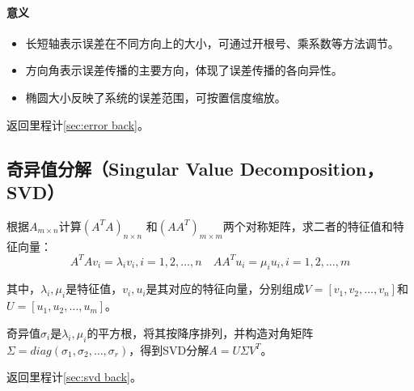 \documentclass[
12pt, %
a4paper, 
oneside, %
headinclude,footinclude, %
]{scrartcl}
\begin{document}
\paragraph{意义}
\begin{itemize}
\item 长短轴表示误差在不同方向上的大小，可通过开根号、乘系数等方法调节。
\item 方向角表示误差传播的主要方向，体现了误差传播的各向异性。
\item 椭圆大小反映了系统的误差范围，可按置信度缩放。
\end{itemize}

返回里程计\ref{sec:error back}。
\subsection[奇异值分解]{奇异值分解（Singular Value Decomposition，SVD）}\label{sec:svd}
根据$ A_{m \times n} $计算$ (A^T A)_{n \times n} $ 和$ (AA^T)_{m \times m} $两个对称矩阵，求二者的特征值和特征向量：
$$ A^T A v_i = \lambda_i v_i, i = 1, 2, \dots, n \quad AA^T u_i = \mu_i u_i, i = 1, 2, \dots, m $$

其中，$ \lambda_i, \mu_i $是特征值，$ v_i, u_i $是其对应的特征向量，分别组成$ V = [v_1, v_2, \dots, v_n] $和$ U = [u_1, u_2, \dots, u_m] $。

奇异值$ \sigma_i $是$ \lambda_i, \mu_i $的平方根，将其按降序排列，并构造对角矩阵$ \Sigma = diag(\sigma_1, \sigma_2, \dots, \sigma_r) $，得到SVD分解$ A = U \Sigma V^T $。

返回里程计\ref{sec:svd back}。
\end{document}
